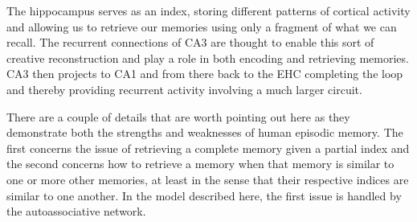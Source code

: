 

The hippocampus serves as an index, storing different patterns of cortical activity and allowing us to retrieve our memories using only a fragment of what we can recall. The recurrent connections of CA3 are thought to enable this sort of creative reconstruction and play a role in both encoding and retrieving memories. CA3 then projects to CA1 and from there back to the EHC completing the loop and thereby providing recurrent activity involving a much larger circuit.


There are a couple of details that are worth pointing out here as they demonstrate both the strengths and weaknesses of human episodic memory. The first concerns the issue of retrieving a complete memory given a partial index and the second concerns how to retrieve a memory when that memory is similar to one or more other memories, at least in the sense that their respective indices are similar to one another. In the model described here, the first issue is handled by the autoassociative network.


